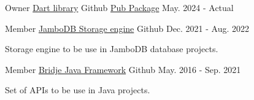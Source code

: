 
\begin{cventries}

  \cventry
    {Owner} %
    {\href{https://github.com/zp1ke/salert}{Dart library}} %
    {\faGithubSquare\acvHeaderIconSep Github} %
    {\href{https://pub.dev/packages/salert}{Pub Package}} %
    {May. 2024 - Actual} %
    {
    }

  \cventry
    {Member} %
    {\href{https://github.com/jambodb/jambodb-storage}{JamboDB Storage engine}} %
    {\faGithubSquare\acvHeaderIconSep Github} %
    {Dec. 2021 - Aug. 2022} %
    {
      \begin{cvitems} %
        \item {Storage engine to be use in JamboDB database projects.}
      \end{cvitems}
    }

  \cventry
    {Member} %
    {\href{https://github.com/touwolf/bridje-framework}{Bridje Java Framework}} %
    {\faGithubSquare\acvHeaderIconSep Github} %
    {May. 2016 - Sep. 2021} %
    {
      \begin{cvitems} %
        \item {Set of APIs to be use in Java projects.}
      \end{cvitems}
    }


\end{cventries}
